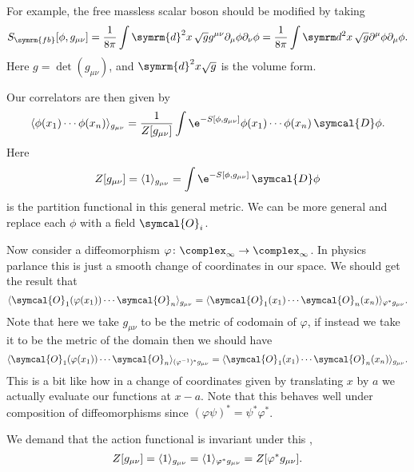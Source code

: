 \documentclass[fleqn]{NotesClass}
\renewcommand{\dl}[1]{\symrm{d}#1}
\newcommand{\quantumField}[1]{\symcal{#1}}
\newcommand{\DD}{\,\symcal{D}}
\DeclarePairedDelimiter{\correlator}{\langle}{\rangle}
\newcommand{\freeboson}{\symrm{fb}}
\begin{document}
    For example, the free massless scalar boson should be modified by taking
    \begin{equation}
        S_{\freeboson}[\phi, g_{\mu\nu}] = \frac{1}{8\pi} \int \dl{^2x} \, \sqrt{g} g^{\mu\nu} \partial_\mu \phi \partial_\nu \phi = \frac{1}{8\pi} \int \dl^2x \, \sqrt{g} \partial^\mu \phi \partial_\mu \phi.
    \end{equation}
    Here \(g = \det(g_{\mu\nu})\), and \(\dl{^2x}\sqrt{g}\) is the volume form.
    
    Our correlators are then given by
    \begin{equation}
        \correlator{\phi(x_1) \dotsm \phi(x_n)}_{g_{\mu\nu}} = \frac{1}{Z[g_{\mu\nu}]} \int \e^{-S[\phi, g_{\mu\nu}]} \phi(x_1) \dotsm \phi(x_n) \DD\phi.
    \end{equation}
    Here
    \begin{equation}
        Z[g_{\mu\nu}] = \correlator{1}_{g_{\mu\nu}} = \int \e^{-S[\phi, g_{\mu\nu}]} \DD\phi
    \end{equation}
    is the partition functional in this general metric.
    We can be more general and replace each \(\phi\) with a field \(\quantumField{O}_i\).
    
    Now consider a diffeomorphism \(\varphi \colon \complex_{\infty} \to \complex_{\infty}\).
    In physics parlance this is just a smooth change of coordinates in our space.
    We should get the result that
    \begin{equation}
        \correlator{\quantumField{O}_1(\varphi(x_1)) \dotsm \quantumField{O}_n}_{g_{\mu\nu}} = \correlator{\quantumField{O}_1(x_1) \dotsm \quantumField{O}_n(x_n)}_{\varphi^*g_{\mu\nu}}.
    \end{equation}
    Note that here we take \(g_{\mu\nu}\) to be the metric of codomain of \(\varphi\), if instead we take it to be the metric of the domain then we should have
    \begin{equation}
        \correlator{\quantumField{O}_1(\varphi(x_1)) \dotsm \quantumField{O}_n}_{(\varphi^{-1})^*g_{\mu\nu}} = \correlator{\quantumField{O}_1(x_1) \dotsm \quantumField{O}_n(x_n)}_{g_{\mu\nu}}.
    \end{equation}
    This is a bit like how in a change of coordinates given by translating \(x\) by \(a\) we actually evaluate our functions at \(x - a\).
    Note that this behaves well under composition of diffeomorphisms since \((\varphi \psi)^* = \psi^* \varphi^*\).
    
    We demand that the action functional is invariant under this ,
    \begin{equation}
        Z[g_{\mu\nu}] = \correlator{1}_{g_{\mu\nu}} = \correlator{1}_{\varphi^*g_{\mu\nu}} = Z[\varphi^*g_{\mu\nu}].
    \end{equation}
    
\end{document}
